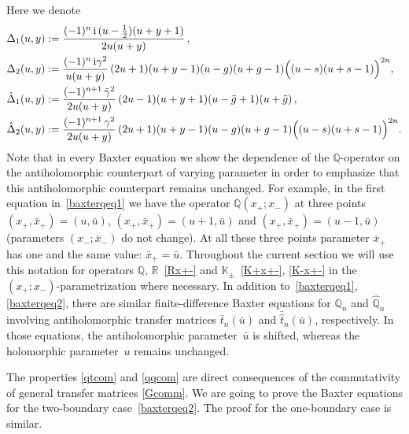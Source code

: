 \documentclass[a4paper,11pt]{article}
\renewcommand{\imath}{\mathrm{i}}
\numberwithin{equation}{section}
\begin{document}
Here we denote 
\begin{align}
	\nonumber
	& \Delta_1(u,y) := \frac{(-1)^n\,\imath\,(u-\frac{1}{2})(u+y+1)}{2u(u+y)}\,, \\ 
	\nonumber
	&\Delta_2(u,y) := \frac{(-1)^n\,\imath\gamma^2}{u(u+y)}\,(2u+1)(u+y-1)(u-g)(u+g-1)\Bigl((u-s)(u+s-1)\Bigr)^{2n} , \\
	\nonumber
	& \hat{\Delta}_1(u,y) := \frac{(-1)^{n+1}\,\tilde{\gamma}^2}{2u(u+y)} \, (2u-1)(u+y+1)(u-\tilde{g}+1)(u+\tilde{g}) \,, \\
	\label{DeltaCoeff}
	& \hat{\Delta}_2(u,y) := \frac{(-1)^{n+1}\,\gamma^2}{2u(u+y)} \, (2u+1)(u+y-1)(u-g)(u+g-1)\Bigl((u-s)(u+s-1)\Bigr)^{2n} .
\end{align}
Note that in every Baxter equation we show the dependence of the $\mathbb{Q}$-operator on the antiholomorphic counterpart of varying parameter in order to emphasize that this antiholomorphic counterpart remains unchanged.
For example, in the first equation in~\eqref{baxterqeq1} we have the operator $\mathbb{Q}(x_+;x_-)$ at three points $(x_+,\bar{x}_+)=(u,\bar{u})$, $(x_+,\bar{x}_+)=(u+1,\bar{u})$ and $(x_+,\bar{x}_+)=(u-1,\bar{u})$ (parameters $(x_-;\bar{x}_-)$ do not change).
At all these three points parameter $\bar{x}_+$ has one and the same value: $\bar{x}_+=\bar{u}$.
Throughout the current section we will use this notation for operators $\mathbb{Q}$, $\mathbb{R}$~\eqref{Rx+-} and $\mathbb{K}_{\pm}$~\eqref{K+x+-}, \eqref{K-x+-} in the $(x_+;x_-)$-parametrization where necessary.
In addition to~\eqref{baxterqeq1}, \eqref{baxterqeq2}, there are similar finite-difference Baxter equations for $\mathbb{Q}_n$ and $\hat{\mathbb{Q}}_n$ involving antiholomorphic transfer matrices $\bar{t}_n(\bar{u})$ and $\bar{\hat{t}}_n(\bar{u})$, respectively.
In those equations, the antiholomorphic parameter~$\bar{u}$
is shifted, whereas the holomorphic parameter~$u$ remains unchanged.

The properties \eqref{qtcom} and \eqref{qqcom} are direct consequences of the commutativity of general transfer matrices \eqref{Gcomm}.
We are going to prove the Baxter equations for the two-boundary case~\eqref{baxterqeq2}. The proof for the one-boundary case is similar.
\end{document}
